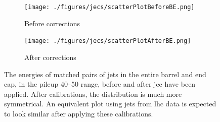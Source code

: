 \begin{figure}[htbp]
    \centering
    \begin{subfigure}[b]{0.45\textwidth}
        \texttt{[image: ./figures/jecs/scatterPlotBeforeBE.png]}
        \caption{Before corrections}
        \label{fig:detector_jecs_scatter_before_BE}
    \end{subfigure}
    \hfill
    \begin{subfigure}[b]{0.45\textwidth}
        \texttt{[image: ./figures/jecs/scatterPlotAfterBE.png]}
        \caption{After corrections}
        \label{fig:detector_jecs_scatter_after_BE}
    \end{subfigure}
\caption[The energies of matched pairs of jets in the entire barrel and end cap, in the pileup 40--50 range, before and after jet energy corrections have been applied]{The energies of matched pairs of \glspl{jet} in the entire barrel and end cap, in the \gls{pileup} 40--50 range, before and after \acrlong{jec} have been applied. After calibrations, the distribution is much more symmetrical. An equivalent plot using \glspl{jet} from \acrshort{lhc} data is expected to look similar after applying these calibrations.}
\label{fig:detector_jecs_scatter_BE}
\end{figure}

